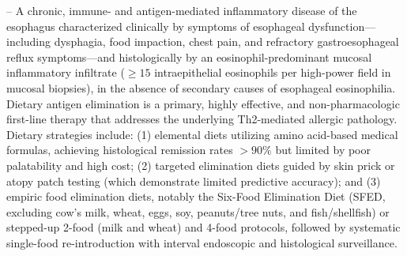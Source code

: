 -- A chronic, immune- and antigen-mediated inflammatory disease of the esophagus characterized clinically by symptoms of esophageal dysfunction---including dysphagia, food impaction, chest pain, and refractory gastroesophageal reflux symptoms---and histologically by an eosinophil-predominant mucosal inflammatory infiltrate ($\ge 15$ intraepithelial eosinophils per high-power field in mucosal biopsies), in the absence of secondary causes of esophageal eosinophilia. Dietary antigen elimination is a primary, highly effective, and non-pharmacologic first-line therapy that addresses the underlying Th2-mediated allergic pathology. Dietary strategies include: (1) elemental diets utilizing amino acid-based medical formulas, achieving histological remission rates $>90\%$ but limited by poor palatability and high cost; (2) targeted elimination diets guided by skin prick or atopy patch testing (which demonstrate limited predictive accuracy); and (3) empiric food elimination diets, notably the Six-Food Elimination Diet (SFED, excluding cow's milk, wheat, eggs, soy, peanuts/tree nuts, and fish/shellfish) or stepped-up 2-food (milk and wheat) and 4-food protocols, followed by systematic single-food re-introduction with interval endoscopic and histological surveillance.

